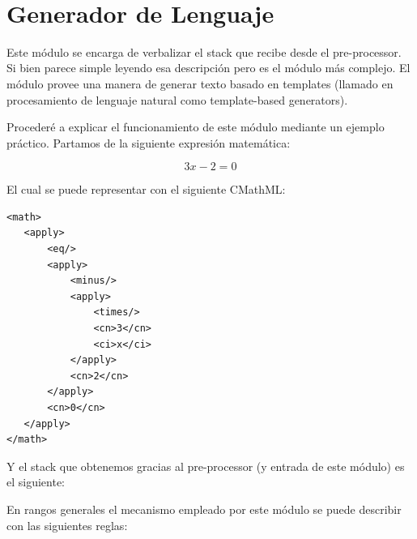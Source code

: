 \\[0.01cm]


\section{Generador de Lenguaje}

Este módulo se encarga de verbalizar el stack que recibe desde el pre-processor. Si bien parece simple leyendo esa descripción pero es el módulo más complejo. El módulo provee una manera de generar texto basado en templates (llamado en procesamiento de lenguaje natural como template-based generators\cite{7}).

Procederé a explicar el funcionamiento de este módulo mediante un ejemplo práctico. Partamos de la siguiente expresión matemática:

$$3x - 2 = 0$$

El cual se puede representar con el siguiente CMathML:

\lstset{language=XML}
\begin{lstlisting}
<math>
   <apply>
       <eq/>
       <apply>
           <minus/>
           <apply>
               <times/>
               <cn>3</cn>
               <ci>x</ci>
           </apply>
           <cn>2</cn>
       </apply>
       <cn>0</cn>
   </apply>
</math>
\end{lstlisting}

Y el stack que obtenemos gracias al pre-processor (y entrada de este módulo) es el siguiente:\\

En rangos generales el mecanismo empleado por este módulo se puede describir con las siguientes reglas:

